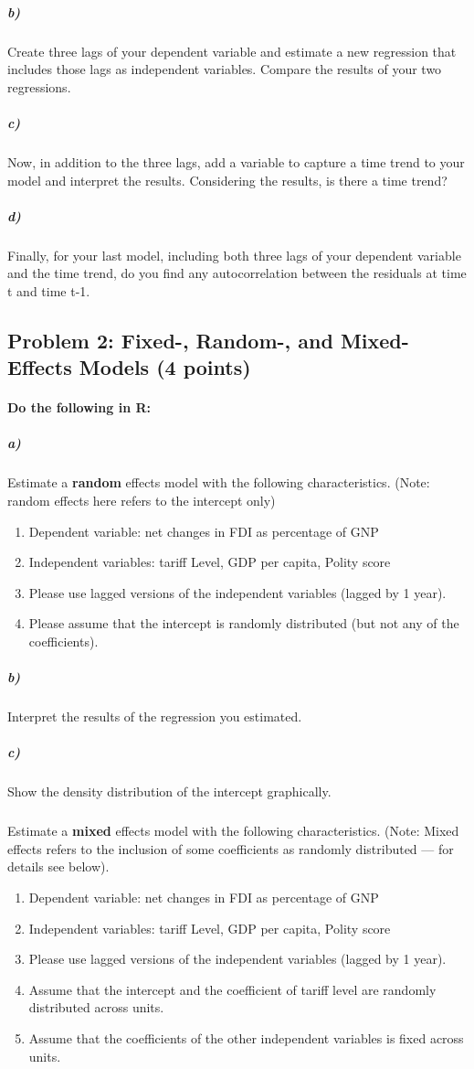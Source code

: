 \documentclass[12pt]{article}
\begin{document}
\subparagraph{b)} Create three lags of your dependent variable and estimate a new regression that includes those lags as independent variables. Compare the results of your two regressions.

\subparagraph{c)} Now, in addition to the three lags, add a variable to capture a time trend to your model and interpret the results. Considering the results, is there a time trend?

\subparagraph{d)} Finally, for your last model, including both three lags of your dependent variable and the time trend, do you find any autocorrelation between the residuals at time t and time t-1.



\subsection*{Problem 2: Fixed-, Random-, and Mixed-Effects Models (4 points)}

\paragraph{Do the following in R:}

\subparagraph{a)} Estimate a \textbf{random}  effects model with the following characteristics. (Note: random effects here refers to the intercept only)

\begin{enumerate}
	\item Dependent variable: net changes in FDI as percentage of GNP
	\item Independent variables: tariff Level, GDP per capita, Polity score
	\item Please use lagged versions of the independent variables (lagged by 1 year).
	\item Please assume that the intercept is randomly distributed (but not any of the coefficients).
\end{enumerate}

\subparagraph{b)} Interpret the results of the regression you estimated.

\subparagraph{c)} Show the density distribution of the intercept graphically.

\subparagraph{} Estimate a \textbf{mixed} effects model with the following characteristics. (Note: Mixed effects refers to the inclusion of some coefficients as randomly distributed --- for details see below).

\begin{enumerate}
	\item Dependent variable: net changes in FDI as percentage of GNP
	\item Independent variables: tariff Level, GDP per capita, Polity score
	\item Please use lagged versions of the independent variables (lagged by 1 year).
	\item Assume that the intercept and the coefficient of tariff level are randomly distributed across units.
	\item Assume that the coefficients of the other independent variables is fixed across units.
\end{enumerate}
\end{document}
